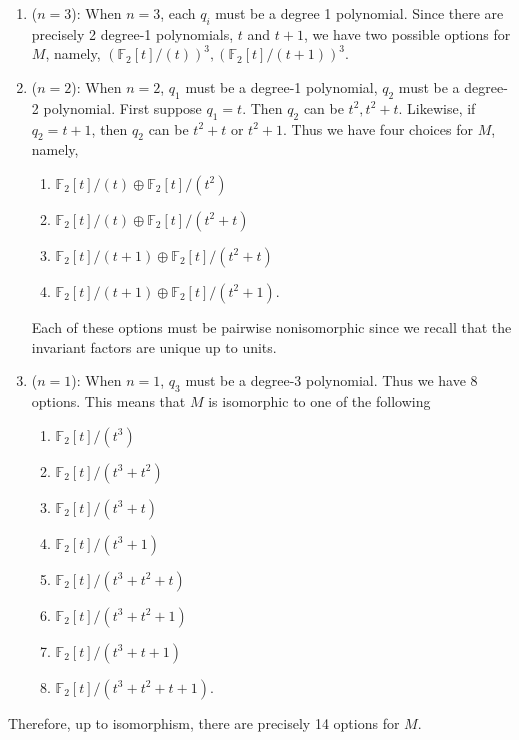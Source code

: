 \documentclass{article}
\begin{document}
	\begin{enumerate}[itemsep =-2pt,label = (\arabic{*})]
		\item ($n = 3$): When $n = 3$, each $q_i$ must be a degree 1 polynomial. Since there are precisely 2 degree-1 polynomials, $t$ and $t + 1$, we have two possible options for $M$, namely, $(\mathbb{F}_{2}[t]/(t))^3, (\mathbb{F}_{2}[t]/(t + 1))^{3}$.
		\item ($n = 2$): When $n = 2$, $q_1$ must be a degree-1 polynomial, $q_2$ must be a degree-2 polynomial. First suppose $q_1 = t$. Then $q_2$ can be $t^2, t^2 + t$. Likewise, if $q_2 = t + 1$, then $q_2$ can be $t^2 + t$ or $t^{2} + 1$. Thus we have four choices for $M$, namely,\vspace{-0.25cm}
		\begin{enumerate}[itemsep =-2pt,label = (\roman{*})]
			\item $\mathbb{F}_{2}[t]/(t) \oplus \mathbb{F}_{2}[t]/(t^2)$
			\item $\mathbb{F}_{2}[t]/(t) \oplus \mathbb{F}_{2}[t]/(t^2 + t)$
			\item $\mathbb{F}_{2}[t]/(t + 1) \oplus \mathbb{F}_{2}[t]/(t^2 + t)$
			\item $\mathbb{F}_{2}[t]/(t + 1) \oplus \mathbb{F}_{2}[t]/(t^2 + 1)$. 
		\end{enumerate}
		Each of these options must be pairwise nonisomorphic since we recall that the invariant factors are unique up to units. 
		\item ($n = 1$): When $n = 1$, $q_3$ must be a degree-3 polynomial. Thus we have 8 options. This means that $M$ is isomorphic to one of the following
		\begin{enumerate}[itemsep =-2pt,label = (\roman{*})]
			\item $\mathbb{F}_{2}[t]/(t^3)$
			\item $\mathbb{F}_{2}[t]/(t^3 + t^2)$ 
			\item $\mathbb{F}_{2}[t]/(t^3 + t)$ 
			\item $\mathbb{F}_{2}[t]/(t^3 + 1)$ 
			\item $\mathbb{F}_{2}[t]/(t^3 + t^2 + t)$ 
			\item $\mathbb{F}_{2}[t]/(t^3 + t^2 + 1)$ 
			\item $\mathbb{F}_{2}[t]/(t^3 + t + 1)$ 
			\item $\mathbb{F}_{2}[t]/(t^3 + t^2 + t + 1)$. 
		\end{enumerate}
	\end{enumerate}
	Therefore, up to isomorphism, there are precisely 14 options for $M$. 
\end{document}
